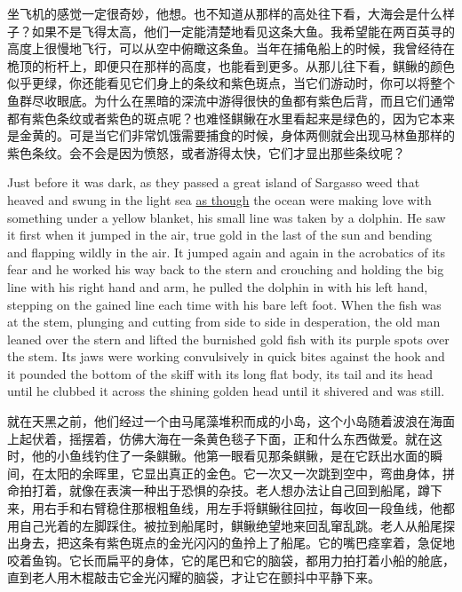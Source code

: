 \begin{paracol}{2}
\switchcolumn

坐飞机的感觉一定很奇妙，他想。也不知道从那样的高处往下看，大海会是什么样子？如果不是飞得太高，他们一定能清楚地看见这条大鱼。我希望能在两百英寻的高度上很慢地飞行，可以从空中俯瞰这条鱼。当年在捕龟船上的时候，我曾经待在桅顶的桁杆上，即便只在那样的高度，也能看到更多。从那儿往下看，鲯鳅的颜色似乎更绿，你还能看见它们身上的条纹和紫色斑点，当它们游动时，你可以将整个鱼群尽收眼底。为什么在黑暗的深流中游得很快的鱼都有紫色后背，而且它们通常都有紫色条纹或者紫色的斑点呢？也难怪鲯鳅在水里看起来是绿色的，因为它本来是金黄的。可是当它们非常饥饿需要捕食的时候，身体两侧就会出现马林鱼那样的紫色条纹。会不会是因为愤怒，或者游得太快，它们才显出那些条纹呢？

\switchcolumn*

Just before it was dark, as they passed a great island of Sargasso weed that
\gls{heaved} and swung in the light sea \uline{as though} the ocean were making love
with something under a yellow blanket, his small line was taken by a
dolphin. He saw it first when it jumped in the air, true gold in the last of
the sun and \gls{bending} and \gls{flapping} wildly in the air. It jumped
again and again in the \gls{acrobatics} of its \gls{fear} and he worked his
way back to the stern and \gls{crouching} and holding the big line with his
right hand and arm, he pulled the dolphin in with his left hand, stepping on
the gained line each time with his bare left foot. When the fish was at the
\gls{stem}, \gls{plunging} and cutting from side to side in
\gls{desperation}, the old man leaned over the stern and lifted the
\gls{burnished} gold fish with its purple spots over the stem. Its
\glspl{jaw} were working \gls{convulsively} in quick \glspl{bite} against the hook
and it pounded the bottom of the skiff with its long flat body, its tail and
its head until he \gls{clubbed} it across the shining golden head until it
shivered and was still.

\switchcolumn

就在天黑之前，他们经过一个由马尾藻堆积而成的小岛，这个小岛随着波浪在海面上起伏着，摇摆着，仿佛大海在一条黄色毯子下面，正和什么东西做爱。就在这时，他的小鱼线钓住了一条鲯鳅。他第一眼看见那条鲯鳅，是在它跃出水面的瞬间，在太阳的余晖里，它显出真正的金色。它一次又一次跳到空中，弯曲身体，拼命拍打着，就像在表演一种出于恐惧的杂技。老人想办法让自己回到船尾，蹲下来，用右手和右臂稳住那根粗鱼线，用左手将鲯鳅往回拉，每收回一段鱼线，他都用自己光着的左脚踩住。被拉到船尾时，鲯鳅绝望地来回乱窜乱跳。老人从船尾探出身去，把这条有紫色斑点的金光闪闪的鱼拎上了船尾。它的嘴巴痉挛着，急促地咬着鱼钩。它长而扁平的身体，它的尾巴和它的脑袋，都用力拍打着小船的舱底，直到老人用木棍敲击它金光闪耀的脑袋，才让它在颤抖中平静下来。


\end{paracol}
